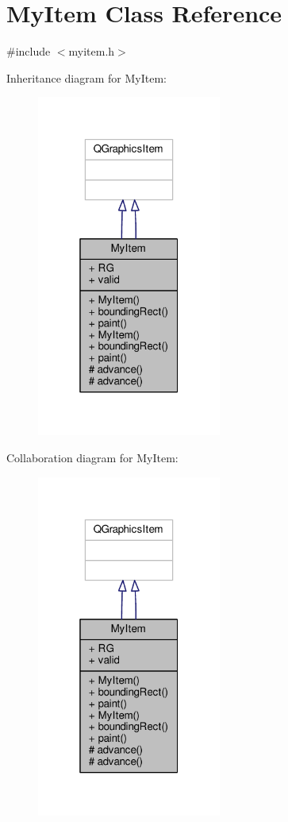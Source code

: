 \hypertarget{classMyItem}{}\section{My\+Item Class Reference}
\label{classMyItem}


{\ttfamily \#include $<$myitem.\+h$>$}



Inheritance diagram for My\+Item\+:
\nopagebreak
\begin{figure}[H]
\begin{center}
\leavevmode
\includegraphics[width=172pt]{classMyItem__inherit__graph}
\end{center}
\end{figure}


Collaboration diagram for My\+Item\+:
\nopagebreak
\begin{figure}[H]
\begin{center}
\leavevmode
\includegraphics[width=172pt]{classMyItem__coll__graph}
\end{center}
\end{figure}
